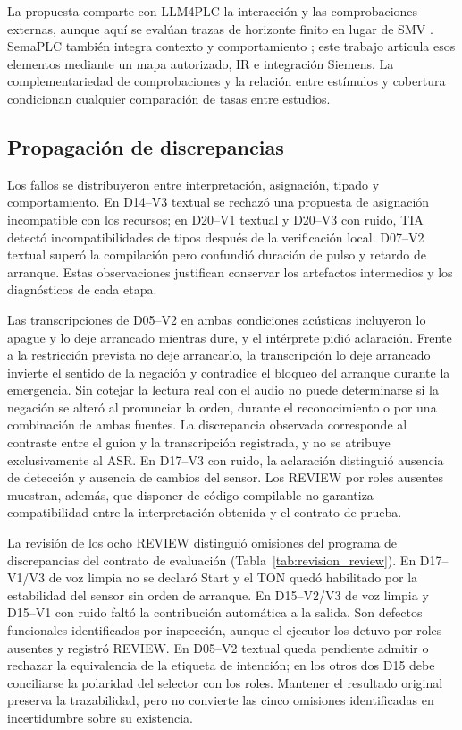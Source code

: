 \documentclass[a4paper,fleqn]{cas-dc}
\begin{document}
La propuesta comparte con LLM4PLC la interacción y las comprobaciones externas, aunque aquí se evalúan trazas de horizonte finito en lugar de SMV \citep{fakih2024llm4plc}. SemaPLC también integra contexto y comportamiento \citep{tu2026semaplc}; este trabajo articula esos elementos mediante un mapa autorizado, IR e integración Siemens. La complementariedad de comprobaciones \citep{schnakenbeck2026comparison} y la relación entre estímulos y cobertura \citep{ma2019plantfeatures} condicionan cualquier comparación de tasas entre estudios.

\subsection{Propagación de discrepancias}
Los fallos se distribuyeron entre interpretación, asignación, tipado y comportamiento. En D14--V3 textual se rechazó una propuesta de asignación incompatible con los recursos; en D20--V1 textual y D20--V3 con ruido, TIA detectó incompatibilidades de tipos después de la verificación local. D07--V2 textual superó la compilación pero confundió duración de pulso y retardo de arranque. Estas observaciones justifican conservar los artefactos intermedios y los diagnósticos de cada etapa.

Las transcripciones de D05--V2 en ambas condiciones acústicas incluyeron \guillemotleft{}lo apague y lo deje arrancado mientras dure\guillemotright{}, y el intérprete pidió aclaración. Frente a la restricción prevista \guillemotleft{}no deje arrancarlo\guillemotright{}, la transcripción \guillemotleft{}lo deje arrancado\guillemotright{} invierte el sentido de la negación y contradice el bloqueo del arranque durante la emergencia. Sin cotejar la lectura real con el audio no puede determinarse si la negación se alteró al pronunciar la orden, durante el reconocimiento o por una combinación de ambas fuentes. La discrepancia observada corresponde al contraste entre el guion y la transcripción registrada, y no se atribuye exclusivamente al ASR. En D17--V3 con ruido, la aclaración distinguió ausencia de detección y ausencia de cambios del sensor. Los REVIEW por roles ausentes muestran, además, que disponer de código compilable no garantiza compatibilidad entre la interpretación obtenida y el contrato de prueba.

La revisión de los ocho REVIEW distinguió omisiones del programa de discrepancias del contrato de evaluación (Tabla~\ref{tab:revision_review}). En D17--V1/V3 de voz limpia no se declaró Start y el TON quedó habilitado por la estabilidad del sensor sin orden de arranque. En D15--V2/V3 de voz limpia y D15--V1 con ruido faltó la contribución automática a la salida. Son defectos funcionales identificados por inspección, aunque el ejecutor los detuvo por roles ausentes y registró REVIEW. En D05--V2 textual queda pendiente admitir o rechazar la equivalencia de la etiqueta de intención; en los otros dos D15 debe conciliarse la polaridad del selector con los roles. Mantener el resultado original preserva la trazabilidad, pero no convierte las cinco omisiones identificadas en incertidumbre sobre su existencia.
\end{document}
